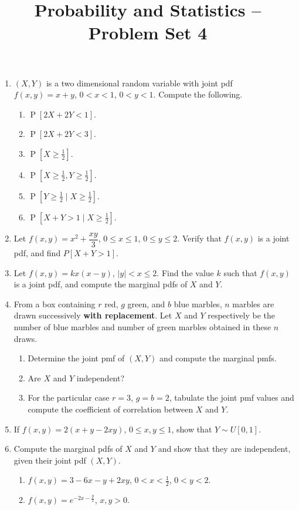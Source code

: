 \documentclass[svgnames]{amsart}
\title[]{Probability and Statistics -- Problem Set 4}
\DeclareMathOperator{\Prob}{P}
\begin{document}
\maketitle
\begin{enumerate}[leftmargin=*]
\item $(X, Y)$ is a two dimensional random variable with joint pdf $f(x, y) = x + y$, $0 < x < 1$, $0 < y < 1$. Compute the following.
\begin{enumerate}
	\item $\Prob[2X + 2Y < 1]$.
	\item $\Prob[2X + 2Y < 3]$.
	\item $\Prob[X \ge \frac 1 2]$.
	\item $\Prob[X \ge \frac 1 2, Y \ge \frac 1 2]$.
	\item $\Prob[Y \ge \frac 1 2 \mid X \ge \frac 1 2]$.
	\item $\Prob[X + Y > 1 \mid X \ge \frac 1 2]$.
\end{enumerate}

\item Let $f(x, y) = x^2 + \dfrac{xy}{3}$, $0 \le x \le 1$, $0 \le y \le 2$. Verify that $f(x, y)$ is a joint pdf, and find $P[X + Y > 1]$.

\item Let $f(x, y) = kx(x - y)$, $|y| < x \le 2$. Find the value $k$ such that $f(x, y)$ is a joint pdf, and compute the marginal pdfs of $X$ and $Y$.

\item From a box containing $r$ red, $g$ green, and $b$ blue marbles, $n$ marbles are drawn successively \textbf{with replacement}. Let $X$ and $Y$ respectively be the number of blue marbles and number of green marbles obtained in these $n$ draws.
\begin{enumerate}
	\item Determine the joint pmf of $(X, Y)$ and compute the marginal pmfs.
	\item Are $X$ and $Y$ independent?
	\item For the particular case $r = 3$, $g = b = 2$, tabulate the joint pmf values and compute the coefficient of correlation between $X$ and $Y$.
\end{enumerate}

\item If $f(x, y) = 2(x + y - 2xy)$, $0 \le x, y \le 1$, show that $Y \sim U[0, 1]$.

\item Compute the marginal pdfs of $X$ and $Y$ and show that they are independent, given their joint pdf $(X, Y)$.
\begin{enumerate}
	\item $f(x, y) = 3 - 6x - y + 2xy$, $0 < x < \frac 1 2$, $0 < y < 2$.
	\item $f(x, y) = e^{-2x - \frac y 2}$, $x, y > 0$.
\end{enumerate}


\end{enumerate}
\end{document}
